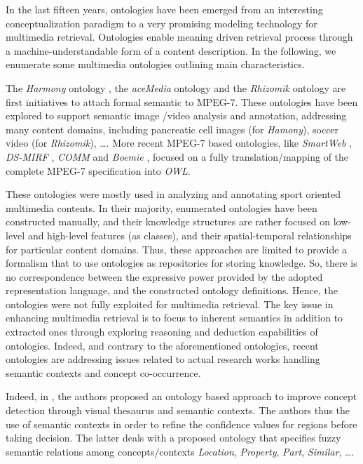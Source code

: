 		In the last fifteen years, ontologies have been emerged from an interesting conceptualization paradigm 
		to a very promising modeling technology for multimedia retrieval. Ontologies enable meaning driven 
		retrieval process through a machine-understandable form of a content description. 
		In the following, we enumerate some multimedia ontologies outlining main characteristics.

		The \emph{Harmony} ontology \citep{Hunter2001}, the \emph{aceMedia} ontology 
		\citep{ Petridis2004} and the	\emph{Rhizomik} \citep{Garcia2005} ontology are first initiatives 
		to attach formal semantic to MPEG-7.  These ontologies have been explored to support 
		semantic image /video analysis and annotation, addressing many content domains, including 
		pancreatic cell images (for \emph{Hamony}),  soccer video (for \emph{Rhizomik}), \dots.  
		More recent MPEG-7 based ontologies, like \emph{SmartWeb} \citep{Oberle2007}, \emph{DS-MIRF} 
		\citep{Tsinaraki2007}, \emph{COMM} \citep{Arndt2007} and \emph{Boemie} \citep{Dasiopoulou2009}, 
		focused on a fully translation/mapping of the complete MPEG-7 specification into \emph{OWL}. 
		
		These ontologies were mostly used in analyzing and annotating sport oriented multimedia contents.
		In their majority, enumerated ontologies have been constructed manually, and their knowledge structures 
		are rather focused on low-level and high-level features (as classes), and their spatial-temporal 
		relationships for particular content domains. Thus, these approaches are limited to provide a 
		formalism that  to use ontologies as repositories for storing knowledge. So, there is no
		correspondence between the expressive power provided by the adopted representation language, and 
		the constructed ontology definitions. Hence, the ontologies were not fully exploited for multimedia 
		retrieval. The key issue in enhancing multimedia retrieval is to focus to inherent semantics in addition 
		to extracted ones through exploring reasoning and deduction capabilities of ontologies. Indeed, and 
		contrary to the aforementioned ontologies, recent ontologies are addressing issues related to actual 
		research works handling semantic contexts and concept co-occurrence.

		Indeed, in \citep{Mylonas2009}, the authors proposed an ontology based approach to improve concept 
		detection through visual thesaurus and semantic contexts. The authors  thus the use 
		of semantic contexts in order to refine the confidence values for regions before taking decision.
		The latter deals with a proposed ontology that specifies fuzzy semantic relations among 
		concepts/contexts \emph{Location}, \emph{Property}, \emph{Part}, \emph{Similar}, \dots{}.

